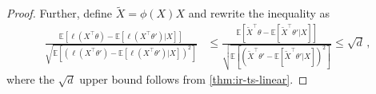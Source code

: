 \documentclass[letter, 12pt]{report}
\newcommand{\E}{\mathbb E}
\newcommand{\1}{\mathbf{1}}
\theoremstyle{plain}
\theoremstyle{definition}
\theoremstyle{remark}
\begin{document}
\begin{proof}
    Further, define $\tilde{X} = \phi(X)X$ and
    rewrite the inequality as
    \begin{align*}
        \frac{
            \E\left[
                \ell(X^\top \theta) - \E[\ell(X^\top \theta')|X]
                \right]
        }{
            \sqrt{
                \E\left[
                    \left(\ell(X^\top \theta') - \E[\ell(X^\top \theta')|X]\right)^2
                    \right]
            }
        }
         & \leq
        \frac{
            \E\left[
                \tilde{X}^\top \theta - \E[\tilde{X}^\top \theta'|X]
                \right]
        }{
            \sqrt{
                \E\left[
                    \left(\tilde{X}^\top \theta' -
                    \E[\tilde{X}^\top \theta'|X]\right)^2
                    \right]
            }
        }
        \leq
        \sqrt{d}\,,
    \end{align*}
    where the $\sqrt{d}$ upper bound follows from \cref{thm:ir-ts-linear}.
\end{proof}
\end{document}

